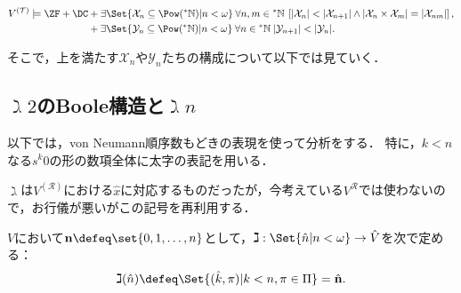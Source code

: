 \documentclass[realisability.tex]{subfiles}
\begin{document}
\begin{theorem}[Krivine]\label{thm:patho-sets-of-reals}
 \[
  V^{(\mathcal{T})}
   \models \ZF + \DC
    \begin{aligned}[t]
     &+\exists \Set{ \mathcal{X}_n \subseteq \Pow(\NN) | n < \omega } \:
     \forall n, m \in \NN \:
    \left[|\mathcal{X}_{n}| < |\mathcal{X}_{n+1}| \land |\mathcal{X}_n \times \mathcal{X}_m| = |\mathcal{X}_{nm}|\right],\\
     &+ \exists \Set{ \mathcal{Y}_n \subseteq \Pow(\NN) | n <\omega} \: \forall n \in\NN \:
       |\mathcal{Y}_{n+1}| < |\mathcal{Y}_n|.
    \end{aligned}
 \]
\end{theorem}

そこで，上を満たす$\mathcal{X}_n$や$\mathcal{Y}_n$たちの構成について以下では見ていく．

\subsection{$\gimel 2$のBoole構造と$\gimel n$}
以下では，von Neumann順序数もどきの表現を使って分析をする．
特に，$k < n$なる$s^k 0$の形の数項全体に太字の表記を用いる．

$\gimel$は$V^{(\mathcal{R})}$における$\hat{x}$に対応するものだったが，今考えている$V^{\mathcal{R}}$では使わないので，お行儀が悪いがこの記号を再利用する．
\begin{notation}
 $V$において$\mathbf{n} \defeq \set{0, 1, \dots, n}$として，$\gimel : \Set{ \hat{n} | n < \omega } \to \hat{V}$を次で定める：
 \[
  \gimel(\hat{n}) \defeq \Set{ (\hat{k}, \pi) | k < n, \pi \in \Pi } = \hat{\mathbf{n}}.
 \]
\end{notation}
\end{document}
